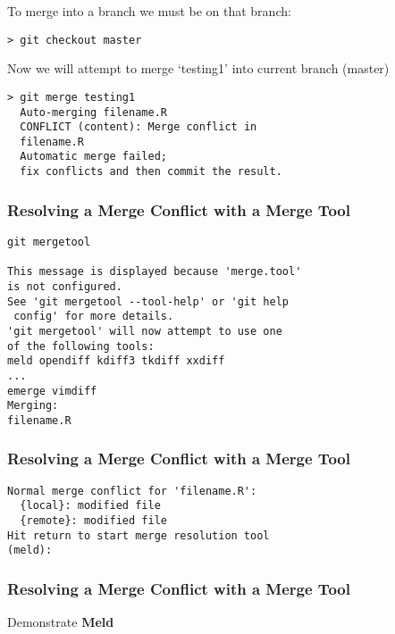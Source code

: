 \documentclass[xcolor=dvipsnames]{beamer}
\begin{document}
\begin{frame}[fragile]
To merge into a branch we must be on that branch:\\
\begin{block}{}
\begin{lstlisting}
> git checkout master
\end{lstlisting}
\end{block}

Now we will attempt to merge `testing1' into current branch (master)
\begin{block}{}
\begin{lstlisting}
> git merge testing1
  Auto-merging filename.R
  CONFLICT (content): Merge conflict in 
  filename.R
  Automatic merge failed; 
  fix conflicts and then commit the result.
\end{lstlisting}
\end{block}
\end{frame}

\begin{frame}[fragile]
\frametitle{Resolving a Merge Conflict with a Merge Tool}
\begin{block}{}
\begin{lstlisting}
git mergetool

This message is displayed because 'merge.tool' 
is not configured.
See 'git mergetool --tool-help' or 'git help
 config' for more details.
'git mergetool' will now attempt to use one
of the following tools:
meld opendiff kdiff3 tkdiff xxdiff 
...
emerge vimdiff
Merging:
filename.R
\end{lstlisting}
\end{block}
\end{frame}

\begin{frame}[fragile]
\frametitle{Resolving a Merge Conflict with a Merge Tool}
\begin{block}{}
\begin{lstlisting}
Normal merge conflict for 'filename.R':
  {local}: modified file
  {remote}: modified file
Hit return to start merge resolution tool
(meld): 
\end{lstlisting}
\end{block}
\end{frame}

\begin{frame}[fragile]
\frametitle{Resolving a Merge Conflict with a Merge Tool}

Demonstrate \textbf{Meld}

\end{frame}
\end{document}
